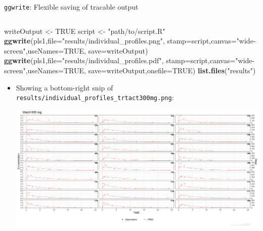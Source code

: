 \documentclass[
  8pt,
  ignorenonframetext,
  aspectratio=169]{beamer}
\newenvironment{Shaded}{\begin{snugshade}}{\end{snugshade}}
\newcommand{\DataTypeTok}[1]{\textcolor[rgb]{0.13,0.29,0.53}{#1}}
\newcommand{\KeywordTok}[1]{\textcolor[rgb]{0.13,0.29,0.53}{\textbf{#1}}}
\newcommand{\NormalTok}[1]{#1}
\newcommand{\OtherTok}[1]{\textcolor[rgb]{0.56,0.35,0.01}{#1}}
\newcommand{\StringTok}[1]{\textcolor[rgb]{0.31,0.60,0.02}{#1}}
\providecommand{\tightlist}{%
  \setlength{\itemsep}{0pt}\setlength{\parskip}{0pt}}
\begin{document}
\begin{frame}[fragile]{\texttt{ggwrite}: Flexible saving of tracable
output}
\begin{columns}[T]
\begin{column}{0.48\textwidth}
\begin{Shaded}
\begin{Highlighting}[]
\NormalTok{writeOutput \textless{}{-}}\StringTok{ }\OtherTok{TRUE}
\NormalTok{script \textless{}{-}}\StringTok{ "path/to/script.R"}
\KeywordTok{ggwrite}\NormalTok{(pls1,}\DataTypeTok{file=}\StringTok{"results/individual\_profiles.png"}\NormalTok{,}
        \DataTypeTok{stamp=}\NormalTok{script,}\DataTypeTok{canvas=}\StringTok{"wide{-}screen"}\NormalTok{,}\DataTypeTok{useNames=}\OtherTok{TRUE}\NormalTok{,}
        \DataTypeTok{save=}\NormalTok{writeOutput)}
\KeywordTok{ggwrite}\NormalTok{(pls1,}\DataTypeTok{file=}\StringTok{"results/individual\_profiles.pdf"}\NormalTok{,}
        \DataTypeTok{stamp=}\NormalTok{script,}\DataTypeTok{canvas=}\StringTok{"wide{-}screen"}\NormalTok{,}\DataTypeTok{useNames=}\OtherTok{TRUE}\NormalTok{,}
        \DataTypeTok{save=}\NormalTok{writeOutput,}\DataTypeTok{onefile=}\OtherTok{TRUE}\NormalTok{)}
\KeywordTok{list.files}\NormalTok{(}\StringTok{"results"}\NormalTok{)}
\end{Highlighting}
\end{Shaded}

\begin{itemize}
\tightlist
\item
  Showing a bottom-right snip of
  \texttt{results/individual\_profiles\_trtact300mg.png}:

  \begin{center}
  \includegraphics[trim={30cm 0 0 14cm},clip]{results/individual_profiles_trtact300mg.png}
  \end{center}
\end{itemize}
\end{column}
\end{columns}
\end{frame}
\end{document}

